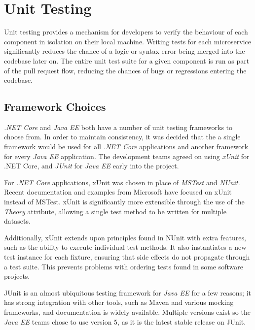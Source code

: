 \section{Unit Testing}
\par
Unit testing provides a mechanism for developers to verify the behaviour of each component in isolation on their local machine. Writing tests for each microservice significantly reduces the chance of a logic or syntax error being merged into the codebase later on. The entire unit test suite for a given component is run as part of the pull request flow, reducing the chances of bugs or regressions entering the codebase.

\par
\subsection{Framework Choices}
\textit{.NET Core} and \textit{Java EE} both have a number of unit testing frameworks to choose from. In order to maintain consistency, it was decided that the a single framework would be used for all \textit{.NET Core} applications and another framework for every \textit{Java EE} application. The development teams agreed on using \textit{xUnit}\cite{xUnit} for .NET Core, and \textit{JUnit}\cite{JUnit} for \textit{Java EE} early into the project.

\par
For \textit{.NET Core} applications, xUnit was chosen in place of \textit{MSTest} and \textit{NUnit}. Recent documentation and examples from Microsoft have focused on xUnit instead of MSTest. xUnit is significantly more extensible through the use of the \textit{Theory} attribute, allowing a single test method to be written for multiple datasets.

\par
Additionally, xUnit extends upon principles found in NUnit with extra features, such as the ability to execute individual test methods\cite{Nunit_XUnit_comparison}. It also instantiates a new test instance for each fixture, ensuring that side effects do not propagate through a test suite. This prevents problems with ordering tests found in some software projects.

\par
JUnit is an almost ubiquitous testing framework for \textit{Java EE} for a few reasons; it has strong integration with other tools, such as Maven and various mocking frameworks, and documentation is widely available. Multiple versions exist so the \textit{Java EE} teams chose to use version 5, as it is the latest stable release on JUnit.

